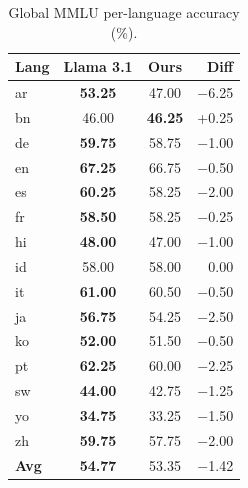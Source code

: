 \documentclass[11pt]{article}
\begin{document}
\begin{table}[h]
\centering
\small
\setlength{\tabcolsep}{3pt}
\begin{tabular}{lccr}
\hline
\textbf{Lang} & \textbf{Llama 3.1} & \textbf{Ours} & \textbf{Diff} \\
\hline
ar & \textbf{53.25} & 47.00 & $-$6.25 \\
bn & 46.00 & \textbf{46.25} & +0.25 \\
de & \textbf{59.75} & 58.75 & $-$1.00 \\
en & \textbf{67.25} & 66.75 & $-$0.50 \\
es & \textbf{60.25} & 58.25 & $-$2.00 \\
fr & \textbf{58.50} & 58.25 & $-$0.25 \\
hi & \textbf{48.00} & 47.00 & $-$1.00 \\
id & 58.00 & 58.00 & 0.00 \\
it & \textbf{61.00} & 60.50 & $-$0.50 \\
ja & \textbf{56.75} & 54.25 & $-$2.50 \\
ko & \textbf{52.00} & 51.50 & $-$0.50 \\
pt & \textbf{62.25} & 60.00 & $-$2.25 \\
sw & \textbf{44.00} & 42.75 & $-$1.25 \\
yo & \textbf{34.75} & 33.25 & $-$1.50 \\
zh & \textbf{59.75} & 57.75 & $-$2.00 \\
\hline
\textbf{Avg} & \textbf{54.77} & 53.35 & $-$1.42 \\
\hline
\end{tabular}
\caption{Global MMLU per-language accuracy (\%).}
\label{tab:gmmlu_full}
\end{table}
\end{document}
